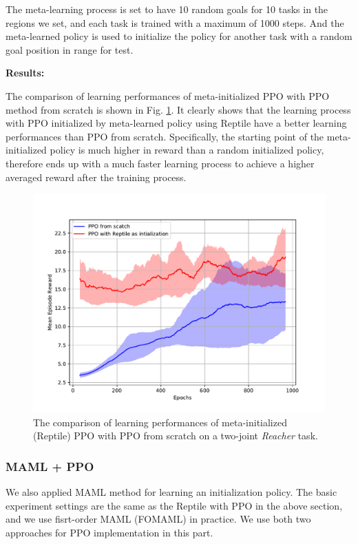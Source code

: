 \documentclass{article}
\begin{document}
The meta-learning process is set to have 10 random goals for 10 tasks in the regions we set, and each task is trained with a maximum of 1000 steps. And the meta-learned policy is used to initialize the policy for another task with a random goal position in range for test.

\textbf{Results:}

The comparison of learning performances of meta-initialized PPO with PPO method from scratch is shown in Fig. \ref{fig:reptile}. It clearly shows that the learning process with PPO initialized by meta-learned policy using Reptile have a better learning performances than PPO from scratch. Specifically, the starting point of the meta-initialized policy is much higher in reward than a random initialized policy, therefore ends up with a much faster learning process to achieve a higher averaged reward after the training process.

\begin{figure}[htbp]
	\centering
	\includegraphics[scale=0.5]{img/Reptile.pdf}
	\caption{The comparison of learning performances of meta-initialized (Reptile) PPO with PPO from scratch on a two-joint \textit{Reacher} task.}
	\label{fig:reptile}
\end{figure}

\subsubsection{MAML + PPO}
We also applied MAML method for learning an initialization policy. The basic experiment settings are the same as the Reptile with PPO in the above section, and we use fisrt-order MAML (FOMAML) in practice. We use both two approaches for PPO implementation in this part.
\end{document}
